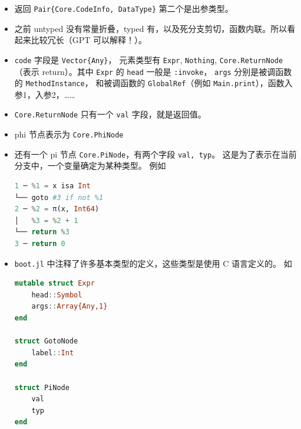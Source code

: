 \begin{itemize}
\item 返回 \verb`Pair{Core.CodeInfo, DataType}` 第二个是出参类型。
\item 之前 untyped 没有常量折叠，typed 有，以及死分支剪切，函数内联。所以看起来比较冗长（GPT 可以解释！）。
\item \verb`code` 字段是 \verb`Vector{Any}`， 元素类型有 \verb`Expr`, \verb`Nothing`, \verb`Core.ReturnNode`（表示 return）。其中 \verb`Expr` 的 \verb`head` 一般是 \verb`:invoke`， \verb`args` 分别是被调函数的 \verb`MethodInstance`， 和被调函数的 \verb`GlobalRef`（例如 \verb`Main.print`），函数入参1，入参2，……
\item \verb`Core.ReturnNode` 只有一个 \verb`val` 字段，就是返回值。
\item phi 节点表示为 \verb`Core.PhiNode`
\item 还有一个 pi 节点 \verb`Core.PiNode`，有两个字段 \verb`val, typ`。 这是为了表示在当前分支中，一个变量确定为某种类型。 例如
\begin{lstlisting}[language=julia]
1 ─ %1 = x isa Int
└── goto #3 if not %1
2 ─ %2 = π(x, Int64)
│   %3 = %2 + 1
└── return %3
3 ─ return 0
\end{lstlisting}
\item \verb`boot.jl` 中注释了许多基本类型的定义，这些类型是使用 C 语言定义的。 如
\begin{lstlisting}[language=julia]
mutable struct Expr
    head::Symbol
    args::Array{Any,1}
end

struct GotoNode
    label::Int
end

struct PiNode
    val
    typ
end


\end{lstlisting}
\end{itemize}
